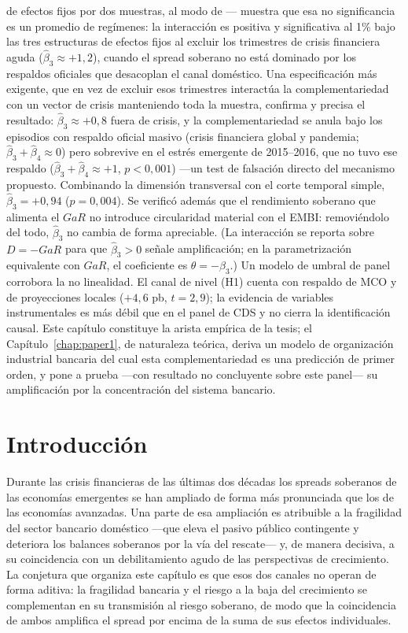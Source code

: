 de efectos fijos por dos muestras, al modo de \citet{Chari2024b}— muestra que esa no significancia es un promedio de regímenes: la interacción es positiva y significativa al 1\% bajo las tres estructuras de efectos fijos al excluir los trimestres de crisis financiera aguda ($\hat\beta_3\approx+1{,}2$), cuando el spread soberano no está dominado por los respaldos oficiales que desacoplan el canal doméstico. Una especificación más exigente, que en vez de excluir esos trimestres interactúa la complementariedad con un vector de crisis manteniendo toda la muestra, confirma y precisa el resultado: $\hat\beta_3\approx+0{,}8$ fuera de crisis, y la complementariedad se anula bajo los episodios con respaldo oficial masivo (crisis financiera global y pandemia; $\hat\beta_3+\hat\beta_4\approx0$) pero sobrevive en el estrés emergente de 2015--2016, que no tuvo ese respaldo ($\hat\beta_3+\hat\beta_4\approx+1$, $p<0{,}001$) —un test de falsación directo del mecanismo propuesto. Combinando la dimensión transversal con el corte temporal simple, $\hat\beta_3=+0{,}94$ ($p=0{,}004$). Se verificó además que el rendimiento soberano que alimenta el $GaR$ no introduce circularidad material con el EMBI: removiéndolo del todo, $\hat\beta_3$ no cambia de forma apreciable. (La interacción se reporta sobre $D=-GaR$ para que $\hat\beta_3>0$ señale amplificación; en la parametrización equivalente con $GaR$, el coeficiente es $\theta=-\beta_3$.) Un modelo de umbral de panel \citep{Hansen1999,Hansen2000} corrobora la no linealidad. El canal de nivel (H1) cuenta con respaldo de MCO y de proyecciones locales ($+4{,}6$ pb, $t=2{,}9$); la evidencia de variables instrumentales es más débil que en el panel de CDS y no cierra la identificación causal. Este capítulo constituye la arista empírica de la tesis; el Capítulo~\ref{chap:paper1}, de naturaleza teórica, deriva un modelo de organización industrial bancaria del cual esta complementariedad es una predicción de primer orden, y pone a prueba —con resultado no concluyente sobre este panel— su amplificación por la concentración del sistema bancario.

\section{Introducción}

Durante las crisis financieras de las últimas dos décadas los spreads soberanos de las economías emergentes se han ampliado de forma más pronunciada que los de las economías avanzadas. Una parte de esa ampliación es atribuible a la fragilidad del sector bancario doméstico —que eleva el pasivo público contingente y deteriora los balances soberanos por la vía del rescate— y, de manera decisiva, a su coincidencia con un debilitamiento agudo de las perspectivas de crecimiento. La conjetura que organiza este capítulo es que esos dos canales no operan de forma aditiva: la fragilidad bancaria y el riesgo a la baja del crecimiento se complementan en su transmisión al riesgo soberano, de modo que la coincidencia de ambos amplifica el spread por encima de la suma de sus efectos individuales.


